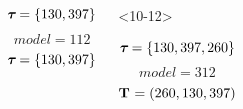 \begin{frame}
\begin{columns}[c]
\begin{onlyenv}
            \begin{minipage}[c][0.5\textheight][c]{\linewidth}
                \begin{displaybox}[0.95\linewidth]
                    \begin{minipage}[c][0.45\textheight][c]{0.95\linewidth}
                        \[
                            \boldsymbol{\tau_{}} = \{130,397\}
                        \]\vspace{0mm}
                        \[
                            model = 112
                        \]\vspace{0mm}
                        \[
                            \boldsymbol{\tau_{}} = \{130,397\}
                        \]\vspace{0mm}
                    \end{minipage}
                \end{displaybox}
            \end{minipage}
        \end{onlyenv}
        \begin{onlyenv}<10-12>
            \begin{minipage}[c][0.5\textheight][c]{\linewidth}
                \begin{displaybox}[0.95\linewidth]
                    \begin{minipage}[c][0.45\textheight][c]{0.95\linewidth}
                        \[
                            \boldsymbol{\tau_{}} = \{130,397,260\}
                        \]\vspace{0mm}
                        \[
                            model = 312
                        \]\vspace{0mm}
                        \[
                            \mathbf{T_{}} = (260,130,397)
                        \]\vspace{0mm}
                    \end{minipage}
                \end{displaybox}
            \end{minipage}
        \end{onlyenv}

\end{columns}
\end{frame}
